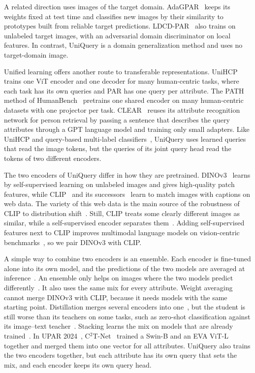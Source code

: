 \documentclass[10pt,twocolumn,letterpaper]{article}
\begin{document}
A related direction uses images of the target domain. AdaGPAR~\cite{adagpar} keeps its weights fixed at test time and classifies new images by their similarity to prototypes built from reliable target predictions. LDCD-PAR~\cite{ldcd} also trains on unlabeled target images, with an adversarial domain discriminator on local features. In contrast, UniQuery is a domain generalization method and uses no target-domain image.

Unified learning offers another route to transferable representations. UniHCP~\cite{unihcp} trains one ViT encoder and one decoder for many human-centric tasks, where each task has its own queries and PAR has one query per attribute. The PATH method of HumanBench~\cite{humanbench} pretrains one shared encoder on many human-centric datasets with one projector per task. CLEAR~\cite{clear} reuses its attribute recognition network for person retrieval by passing a sentence that describes the query attributes through a GPT language model and training only small adapters. Like UniHCP and query-based multi-label classifiers~\cite{q2l,mldecoder}, UniQuery uses learned queries that read the image tokens, but the queries of its joint query head read the tokens of two different encoders.

The two encoders of UniQuery differ in how they are pretrained. DINOv3~\cite{dinov3} learns by self-supervised learning on unlabeled images and gives high-quality patch features, while CLIP~\cite{clip} and its successors~\cite{metaclip,dfn,evaclip,siglip2,pe} learn to match images with captions on web data. The variety of this web data is the main source of the robustness of CLIP to distribution shift~\cite{clipdata}. Still, CLIP treats some clearly different images as similar, while a self-supervised encoder separates them~\cite{eyeswide}. Adding self-supervised features next to CLIP improves multimodal language models on vision-centric benchmarks~\cite{eyeswide,cambrian}, so we pair DINOv3 with CLIP.

A simple way to combine two encoders is an ensemble. Each encoder is fine-tuned alone into its own model, and the predictions of the two models are averaged at inference~\cite{deepens}. An ensemble only helps on images where the two models predict differently~\cite{krogh}. It also uses the same mix for every attribute. Weight averaging~\cite{soups,wiseft} cannot merge DINOv3 with CLIP, because it needs models with the same starting point. Distillation merges several encoders into one~\cite{amradio}, but the student is still worse than its teachers on some tasks, such as zero-shot classification against its image--text teacher~\cite{amradio,cradio4}. Stacking learns the mix on models that are already trained~\cite{stacking}. In UPAR 2024~\cite{upar24}, C$^2$T-Net~\cite{c2tnet} trained a Swin-B and an EVA ViT-L together and merged them into one vector for all attributes. UniQuery also trains the two encoders together, but each attribute has its own query that sets the mix, and each encoder keeps its own query head.
\end{document}
